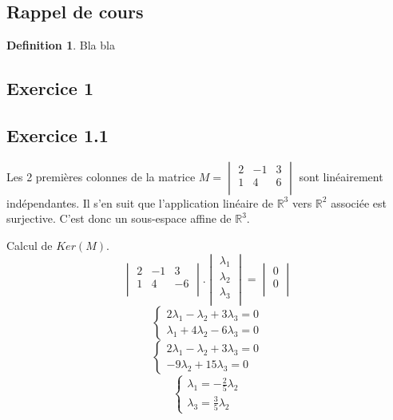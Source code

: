 \documentclass[]{book}
\theoremstyle{definition}
\newtheorem{defn}{Definition}
\newcommand{\bb}[1]{\mathbb{#1}}
\newcommand{\R}{\bb{R}}
\begin{document}
\subsection*{Rappel de cours}
\begin{defn}
Bla bla
\end{defn}



\newpage
\subsection*{Exercice 1}
\subsection*{Exercice 1.1}

Les 2 premi\`eres colonnes de la matrice $M=\begin{vmatrix}
    2 & -1 & 3 \\
    1 & 4 & 6 \\
\end{vmatrix}$ sont lin\'eairement ind\'ependantes. Il s'en suit que l'application lin\'eaire de $\R^3$ vers $\R^2$ associ\'ee est surjective. C'est donc un sous-espace affine de $\R^3$.

Calcul de $Ker(M)$.
$$
\begin{vmatrix}
    2 & -1 & 3 \\
    1 & 4 & -6 \\
\end{vmatrix} . 
\begin{vmatrix}
    \lambda_1 \\
    \lambda_2 \\
    \lambda_3 \\
\end{vmatrix}
=
\begin{vmatrix}
    0 \\
    0 \\
\end{vmatrix}
$$
$$
\left\{ 
    \begin{array}{l}
        2\lambda_1 - \lambda_2 + 3 \lambda_3 = 0 \\
        \lambda_1 + 4 \lambda_2 - 6\lambda_3 = 0
    \end{array}
\right.
$$
$$
\left\{ 
    \begin{array}{l}
        2\lambda_1 - \lambda_2 + 3 \lambda_3 = 0 \\
         -9 \lambda_2 + 15\lambda_3 = 0
    \end{array}
\right.
$$
$$
\left\{ 
    \begin{array}{l}
        \lambda_1 = -\frac{2}{5} \lambda_2 \\
        \lambda_3 = \frac{3}{5} \lambda_2 
    \end{array}
\right.
$$
\end{document}
